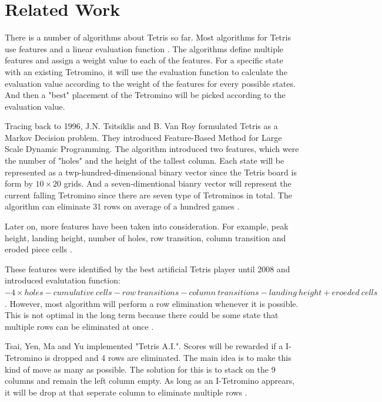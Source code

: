 \documentclass[letterpaper]{article} %
\begin{document}

\section{Related Work} 

There is a number of algorithms about Tetris so far. Most algorithms for Tetris use features and a linear evaluation function \cite{SO19}. The algorithms define multiple features and assign a weight value to each of the features. For a specific state with an existing Tetromino, it will use the evaluation function to calculate the evaluation value according to the weight of the features for every possible states. And then a "best" placement of the Tetromino will be picked according to the evaluation value.

Tracing back to 1996, J.N. Tsitsiklis and B. Van Roy formulated Tetris as a Markov Decision problem. They introduced Feature-Based Method for Large Scale Dynamic Programming. The algorithm introduced two features, which were the number of "holes" and the height of the tallest column. Each state will be represented as a twp-hundred-dimensional binary vector since the Tetris board is form by $10 \times 20$ grids. And a seven-dimentional bianry vector will represent the current falling Tetromino since there are seven type of Tetrominos in total. The algorithm can eliminate 31 rows on average of a hundred games \cite{TV96}.

Later on, more features have been taken into consideration. For example, peak height, landing height, number of holes, row transition, column transition and eroded piece cells \cite{WCWT}. 

These features were identified by the best artificial Tetris player until 2008 and introduced evalutation function: 
$-4 \times holes - cumulative\ cells - row\ transitions - column\ transitions - landing\ height + eroeded\ cells$ \cite{SO19}. However, most algorithm will perform a row elimination whenever it is possible. This is not optimal in the long term because there could be some state that multiple rows can be eliminated at once \cite{WCWT}. 

Tsai, Yen, Ma and Yu implemented "Tetris A.I.". Scores will be rewarded if a I-Tetromino is dropped and 4 rows are eliminated. The main idea is to make this kind of move as many as possible. The solution for this is to stack on the 9 columns and remain the left column empty. As long as an I-Tetromino apprears, it will be drop at that seperate column to eliminate multiple rows \cite{WCWT}.
\end{document}
